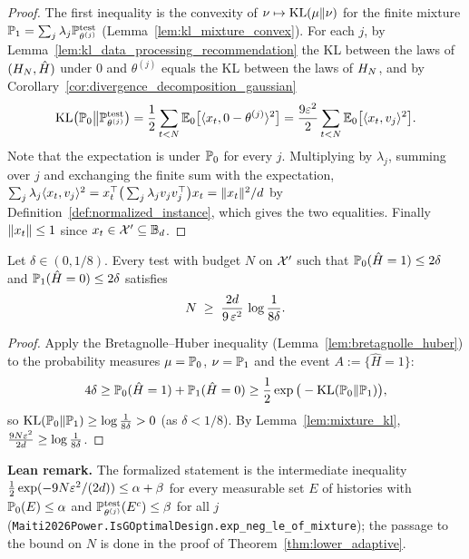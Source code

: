 \begin{proof}
\leanok
{}
The first inequality is the convexity of $\nu \mapsto \mathrm{KL}(\mu\|\nu)$ for the finite mixture
$\mathbb{P}_1 = \sum_j\lambda_j\mathbb{P}^{\mathrm{test}}_{\theta^{(j)}}$ (Lemma~\ref{lem:kl_mixture_convex}). For each
$j$, by Lemma~\ref{lem:kl_data_processing_recommendation} the KL between the laws of
$(H_N,\hat H)$ under $0$ and $\theta^{(j)}$ equals the KL between the laws of $H_N$,
and by Corollary~\ref{cor:divergence_decomposition_gaussian}
\[
  \mathrm{KL}\big(\mathbb{P}_0\big\|\mathbb{P}^{\mathrm{test}}_{\theta^{(j)}}\big)
  = \frac12\sum_{t<N}\mathbb{E}_0\big[\langle x_t, 0 - \theta^{(j)} \rangle^2\big]
  = \frac{9\varepsilon^2}{2}\sum_{t<N}\mathbb{E}_0\big[\langle x_t, v_j \rangle^2\big] .
\]
Note that the expectation is under $\mathbb{P}_0$ for every $j$. Multiplying by $\lambda_j$,
summing over $j$ and exchanging the finite sum with the expectation,
$\sum_j\lambda_j\langle x_t, v_j \rangle^2 = x_t^\top\big(\sum_j\lambda_jv_jv_j^\top\big)x_t = \lVert x_t \rVert^2/d$
by Definition~\ref{def:normalized_instance}, which gives the two equalities. Finally
$\lVert x_t \rVert \le 1$ since $x_t \in \mathcal{X}' \subseteq \mathbb{B}_d$.
\end{proof}

\begin{lemma}\label{lem:test_lower}
\leanok
{}
Let $\delta \in (0,1/8)$. Every test with budget $N$ on $\mathcal{X}'$ such that
$\mathbb{P}_0(\hat H = 1) \le 2\delta$ and $\mathbb{P}_1(\hat H = 0) \le 2\delta$ satisfies
\[
  N \;\ge\; \frac{2d}{9\,\varepsilon^2}\,\log\frac{1}{8\delta} .
\]
\end{lemma}

\begin{proof}
\leanok
{}
Apply the Bretagnolle--Huber inequality (Lemma~\ref{lem:bretagnolle_huber}) to the
probability measures $\mu = \mathbb{P}_0$, $\nu = \mathbb{P}_1$ and the event $A := \{\hat H = 1\}$:
\[
  4\delta \ge \mathbb{P}_0(\hat H = 1) + \mathbb{P}_1(\hat H = 0) \ge \frac12\exp\big(-\mathrm{KL}(\mathbb{P}_0\|\mathbb{P}_1)\big),
\]
so $\mathrm{KL}(\mathbb{P}_0\|\mathbb{P}_1) \ge \log\frac{1}{8\delta} > 0$ (as $\delta < 1/8$). By
Lemma~\ref{lem:mixture_kl}, $\frac{9N\varepsilon^2}{2d} \ge \log\frac{1}{8\delta}$.
\end{proof}

\textbf{Lean remark.} The formalized statement is the intermediate inequality
$\frac12\exp(-9N\varepsilon^2/(2d)) \le \alpha + \beta$ for every measurable set $E$ of histories
with $\mathbb{P}_0(E) \le \alpha$ and $\mathbb{P}^{\mathrm{test}}_{\theta^{(j)}}(E^c) \le \beta$ for all $j$
(\texttt{Maiti2026Power.IsGOptimalDesign.exp\_neg\_le\_of\_mixture}); the passage to the bound on $N$
is done in the proof of Theorem~\ref{thm:lower_adaptive}.

